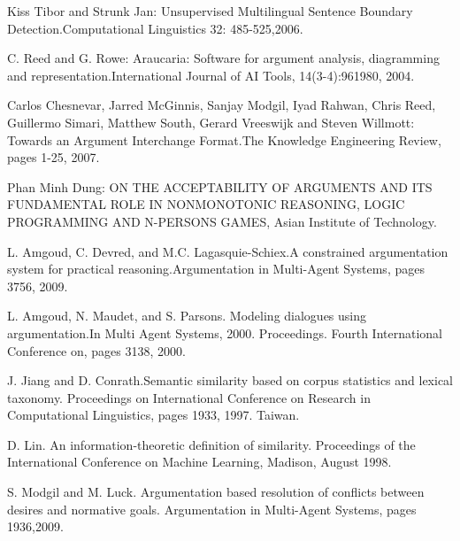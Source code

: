 \documentclass[lnbip]{svmultln}
\begin{document}
\begin{thebibliography}{5}
Kiss Tibor and Strunk Jan: Unsupervised Multilingual Sentence Boundary Detection.Computational Linguistics 32: 485-525,2006.

C. Reed and G. Rowe: Araucaria: Software for argument analysis, diagramming and representation.International Journal of AI Tools, 14(3-4):961{980, 2004}.

Carlos Chesnevar, Jarred McGinnis, Sanjay Modgil, Iyad Rahwan, Chris Reed, Guillermo Simari, Matthew South, Gerard Vreeswijk and Steven Willmott: Towards an Argument Interchange Format.The Knowledge Engineering Review, pages 1-25, 2007.

Phan Minh Dung: ON THE ACCEPTABILITY OF ARGUMENTS AND ITS FUNDAMENTAL ROLE IN NONMONOTONIC REASONING, LOGIC PROGRAMMING AND N-PERSONS GAMES, Asian Institute of Technology.

L. Amgoud, C. Devred, and M.C. Lagasquie-Schiex.A constrained argumentation system for practical reasoning.Argumentation in Multi-Agent Systems, pages 37{56, 2009}.

L. Amgoud, N. Maudet, and S. Parsons. Modeling dialogues using argumentation.In Multi Agent Systems, 2000. Proceedings. Fourth International Conference on, pages 31{38, 2000}.

J. Jiang and D. Conrath.Semantic similarity based on corpus statistics and lexical taxonomy. Proceedings on International Conference on Research in Computational Linguistics, pages 19{33, 1997. Taiwan}.

D. Lin. An information-theoretic definition of similarity. Proceedings of the International Conference on Machine Learning, Madison, August 1998.

S. Modgil and M. Luck. Argumentation based resolution of conflicts between desires and normative goals. Argumentation in Multi-Agent Systems, pages 19{36,2009}.

\end{thebibliography}
\end{document}
